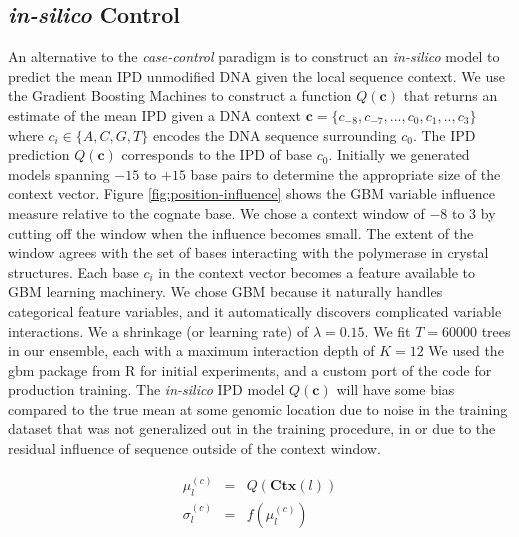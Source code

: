 \documentclass[pdftex]{article}
\begin{document}
\subsection{\emph{in-silico} Control}
An alternative to the \emph{case-control} paradigm is to construct an \emph{in-silico} model to predict the mean IPD  unmodified DNA given the local sequence context. We use the Gradient Boosting Machines \cite{gradientboost} to construct a function $Q(\mathbf{c})$ that returns an estimate of the mean IPD given a DNA context $\mathbf{c} = \{c_{-8}, c_{-7}, ... ,c_0, c_1, .., c_3\}$ where $c_i \in \{A, C, G, T\}$ encodes the DNA sequence surrounding $c_0$. The IPD prediction $Q(\mathbf{c})$ corresponds to the IPD of base $c_0$. Initially we generated models spanning $-15$ to $+15$ base pairs to determine the appropriate size of the context vector. Figure \ref{fig:position-influence} shows the GBM variable influence measure relative to the cognate base. We chose a context window of $-8$ to $3$ by cutting off the window when the influence becomes small.  The extent of the window agrees with the set of bases interacting with the polymerase in crystal structures.  Each base $c_i$ in the context vector becomes a feature available to GBM learning machinery. We chose GBM because it naturally handles categorical feature variables, and it automatically discovers complicated variable interactions. We a shrinkage (or learning rate) of $\lambda=0.15$. We fit $T=60000$ trees in our ensemble, each with a maximum interaction depth of $K=12$  We used the \textsf{gbm} package\cite{gbm} from R for initial experiments, and a custom port of the code for production training.  The \emph{in-silico} IPD model $Q(\mathbf{c})$ will have some bias compared to the true mean at some genomic location due to noise in the training dataset that was not generalized out in the training procedure, in or due to the residual influence of sequence outside of the context window. 

\begin{eqnarray}
\mu_l^{(c)} & = & Q(\mathbf{Ctx}(l)) \\
\sigma_l^{(c)} & = & f(\mu_l^{(c)})
\end{eqnarray}
\end{document}
